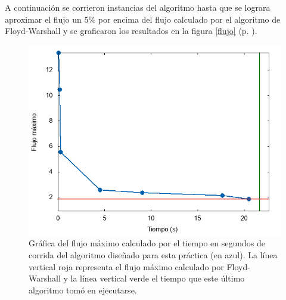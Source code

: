 \documentclass{article}
\begin{document}
  A continuación se corrieron instancias del algoritmo hasta que se lograra aproximar el flujo un $5$\% por encima del flujo calculado por el algoritmo de Floyd-Warshall y se graficaron los resultados en la figura \ref{flujo} (p. \pageref{flujo}).

  \begin{figure}[h]
    \includegraphics[width=1\textwidth]{flujo}
    \centering
    \caption{Gráfica del flujo máximo calculado por el tiempo en segundos de corrida del algoritmo diseñado para esta práctica (en azul). La línea vertical roja representa el flujo máximo calculado por Floyd-Warshall y la línea vertical verde el tiempo que este último algoritmo tomó en ejecutarse.}
    \label{grafoEjemplo6}
  \end{figure}

  {}
  
\end{document}
